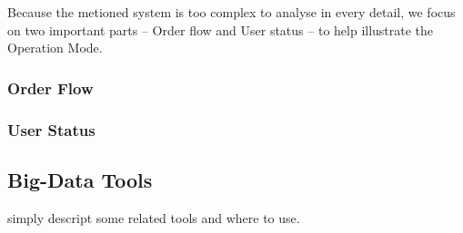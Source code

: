 Because the metioned system is too complex to analyse in every detail, we focus on two important parts -- Order flow and User status -- to help illustrate the Operation Mode.

\subsubsection{Order Flow}

\subsubsection{User Status}

\subsection{Big-Data Tools}
simply descript some related tools and where to use.
